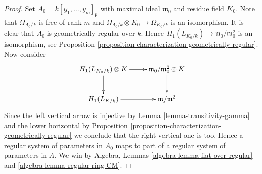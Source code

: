 \documentclass[10pt,a4paper]{amsart}
\theoremstyle{plain}
\theoremstyle{definition}
\theoremstyle{remark}
\numberwithin{equation}{subsection}
\begin{document}
\begin{proof}
Set $A_0 = k[y_1, \ldots, y_m]_\mathfrak p$ with maximal ideal
$\mathfrak m_0$ and residue field $K_0$. Note that
$\Omega_{A_0/k}$ is free of rank $m$ and
$\Omega_{A_0/k} \otimes K_0 \to \Omega_{K_0/k}$ is an isomorphism.
It is clear that $A_0$ is geometrically regular over $k$. Hence
$H_1(L_{K_0/k}) \to \mathfrak m_0/\mathfrak m_0^2$ is an isomorphism, see
Proposition \ref{proposition-characterization-geometrically-regular}.
Now consider
$$
\xymatrix{
H_1(L_{K_0/k}) \otimes K \ar[d] \ar[r] &
\mathfrak m_0/\mathfrak m_0^2 \otimes K \ar[d] \\
H_1(L_{K/k}) \ar[r] & \mathfrak m/\mathfrak m^2
}
$$
Since the left vertical arrow is injective by
Lemma \ref{lemma-transitivity-gamma}
and the lower horizontal by
Proposition \ref{proposition-characterization-geometrically-regular}
we conclude that the right vertical one is too.
Hence a regular system of parameters in $A_0$ maps to
part of a regular system of parameters in $A$.
We win by
Algebra, Lemmas \ref{algebra-lemma-flat-over-regular} and
\ref{algebra-lemma-regular-ring-CM}.
\end{proof}
\end{document}
